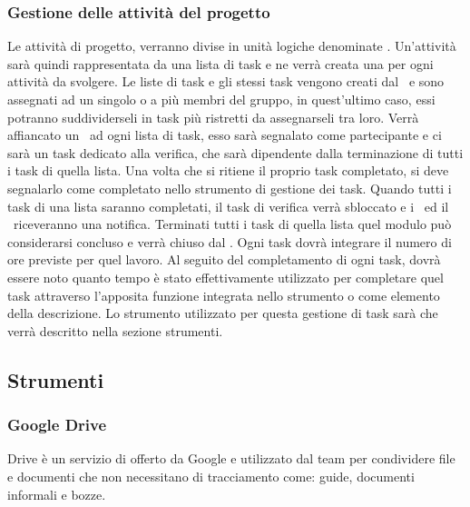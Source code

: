 \documentclass[../NormeDiProgetto.tex]{subfiles}
\begin{document}
\subsubsection{Gestione delle attività del progetto}
Le attività di progetto, verranno divise in unità logiche denominate . Un'attività sarà quindi rappresentata da una lista di task e ne verrà creata una per ogni attività da svolgere.
Le liste di task e gli stessi task vengono creati dal \responsabilediprogetto\ e sono assegnati ad un singolo o a più membri del gruppo, in quest'ultimo caso, essi potranno suddividerseli in task più ristretti da assegnarseli tra loro.
Verrà affiancato un \verificatore\ ad ogni lista di task, esso sarà segnalato come partecipante e ci sarà un task dedicato alla verifica, che sarà dipendente dalla terminazione di tutti i task di quella lista.
Una volta che si ritiene il proprio task completato, si deve segnalarlo come completato nello strumento di gestione dei task.
Quando tutti i task di una lista saranno completati, il task di verifica verrà sbloccato e i \verificatori\ ed il \responsabilediprogetto\ riceveranno una notifica.
Terminati tutti i task di quella lista quel modulo può considerarsi concluso e verrà chiuso dal \responsabilediprogetto.
Ogni task dovrà integrare il numero di ore previste per quel lavoro.
Al seguito del completamento di ogni task, dovrà essere noto quanto tempo è stato effettivamente utilizzato per completare quel task attraverso l'apposita funzione integrata nello strumento o come elemento della descrizione.
Lo strumento utilizzato per questa gestione di task sarà  che verrà descritto nella sezione strumenti.
\subsection{Strumenti}

\subsubsection{Google Drive}
Drive è un servizio di  offerto da Google e utilizzato dal team per condividere file e documenti che non necessitano di tracciamento come: guide, documenti informali e bozze.
\end{document}

